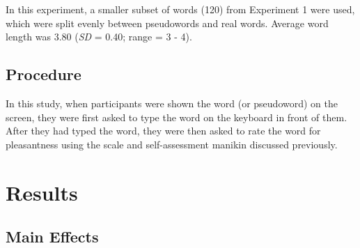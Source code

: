 \documentclass[english,man]{apa6}
\theoremstyle{definition}
\theoremstyle{definition}
\theoremstyle{definition}
\theoremstyle{remark}
\begin{document}
In this experiment, a smaller subset of words (120) from Experiment 1
were used, which were split evenly between pseudowords and real words.
Average word length was 3.80 (\emph{SD} = 0.40; range = 3 - 4).

\subsection{Procedure}\label{procedure-1}

In this study, when participants were shown the word (or pseudoword) on
the screen, they were first asked to type the word on the keyboard in
front of them. After they had typed the word, they were then asked to
rate the word for pleasantness using the scale and self-assessment
manikin discussed previously.

\section{Results}\label{results-1}

\subsection{Main Effects}\label{main-effects-1}
\end{document}
